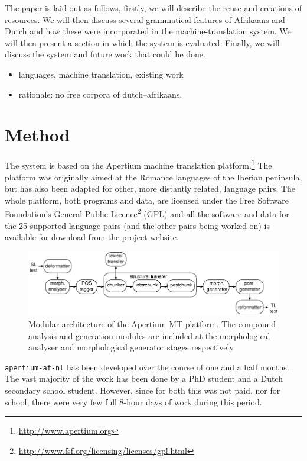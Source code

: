 \documentclass[11pt]{article}
\begin{document}
The paper is laid out as follows, firstly, we will describe the reuse and creations of 
resources. We will then discuss several grammatical features of Afrikaans and Dutch and how 
these were incorporated in the machine-translation system. We will then present a section 
in which the system is evaluated. Finally, we will discuss the system and future work that 
could be done.


\begin{itemize}
\item languages, machine translation, existing work
\item rationale: no free corpora of dutch--afrikaans.
\end{itemize}

\section{Method}

The system is based on the Apertium machine translation platform.\footnote{\url{http://www.apertium.org}} The
platform was originally aimed at the Romance languages of the Iberian
peninsula, but has also been adapted for other, more distantly related,
language pairs. The whole platform, both programs and data, are licensed
under the Free Software Foundation's General Public
Licence\footnote{\url{http://www.fsf.org/licensing/licenses/gpl.html}} (GPL)
and all the software and data for the 25 supported language pairs (and the
other pairs being worked on) is available for download from the project
website.

\begin{figure}
  \centering
  \includegraphics[scale=0.8]{apertium2.pdf}
  \caption{Modular architecture of the Apertium MT
    platform. The compound analysis and generation modules are included at the morphological
    analyser and morphological generator stages respectively.}
\label{fg:apertium}
\end{figure}

{\small {\tt apertium-af-nl}} has been developed over the course of one and a half months.
The vast majority of the work has been done by a PhD student and a Dutch secondary 
school student. However, since for both this was not paid, nor for school, there were 
very few full 8-hour days of work during this period.
\end{document}
